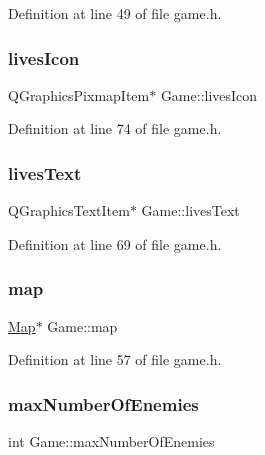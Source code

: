 Definition at line 49 of file game.\+h.

\mbox{\label{class_game_acd6dae5d8f0c5670fa81433f5b329e0f}} 
\subsubsection{\texorpdfstring{lives\+Icon}{livesIcon}}
{\footnotesize\ttfamily Q\+Graphics\+Pixmap\+Item$\ast$ Game\+::lives\+Icon}



Definition at line 74 of file game.\+h.

\mbox{\label{class_game_ab83806346d49346a645bc850c51e331c}} 
\subsubsection{\texorpdfstring{lives\+Text}{livesText}}
{\footnotesize\ttfamily Q\+Graphics\+Text\+Item$\ast$ Game\+::lives\+Text}



Definition at line 69 of file game.\+h.

\mbox{\label{class_game_acef3a39fdf14be2c980b0dc11e7be402}} 
\subsubsection{\texorpdfstring{map}{map}}
{\footnotesize\ttfamily \hyperlink{class_map}{Map}$\ast$ Game\+::map}



Definition at line 57 of file game.\+h.

\mbox{\label{class_game_aaee1756450bae685777ee86c45ef4f78}} 
\subsubsection{\texorpdfstring{max\+Number\+Of\+Enemies}{maxNumberOfEnemies}}
{\footnotesize\ttfamily int Game\+::max\+Number\+Of\+Enemies}



